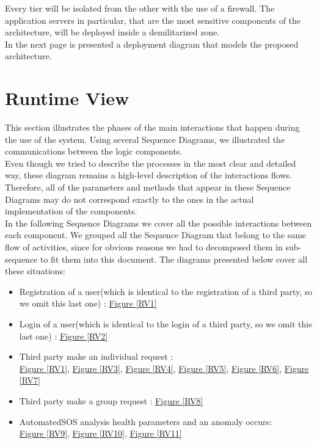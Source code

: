 Every tier will be isolated from the other with the use of a firewall. The application servers in particular, that are the most sensitive components of the architecture, will be deployed inside a demilitarized zone.\\
In the next page is presented a deployment diagram that models the proposed architecture.
\begin{landscape}

\end{landscape}

\hypertarget{RV}{\section{Runtime View}}
This section illustrates the phases of the main interactions that happen during the use of the system. Using several Sequence Diagrams, we illustrated the communications between the logic components.\\
Even though we tried to describe the processes in the most clear and detailed way, these diagram remains a high-level description of the interactions flows. Therefore, all of the parameters and methods that appear in these Sequence Diagrams may do not correspond exactly to the ones in the actual implementation of the components.\\
In the following Sequence Diagrams we cover all the possible interactions between each component. We grouped all the Sequence Diagram that belong to the same flow of activities, since for obvious reasons we had to decomposed them in sub-sequence to fit them into this document.
The diagrams presented below cover all these situations:
\begin{itemize}
    \item Registration of a user(which is identical to the registration of a third party, so we omit this last one) : \underline{Figure \ref{RV1}}
    \item Login of a user(which is identical to the login of a third party, so we omit this last one) : \underline{Figure \ref{RV2}}
    \item Third party make an individual request :\\ \underline{Figure \ref{RV1}}, \underline{Figure \ref{RV3}}, \underline{Figure \ref{RV4}}, \underline{Figure \ref{RV5}}, \underline{Figure \ref{RV6}}, \underline{Figure \ref{RV7}}
    \item Third party make a group request :  \underline{Figure \ref{RV8}}
    \item AutomatedSOS analysis health parameters and an anomaly occurs:\\ \underline{Figure \ref{RV9}},  \underline{Figure \ref{RV10}},  \underline{Figure \ref{RV11}}
    
\end{itemize}

